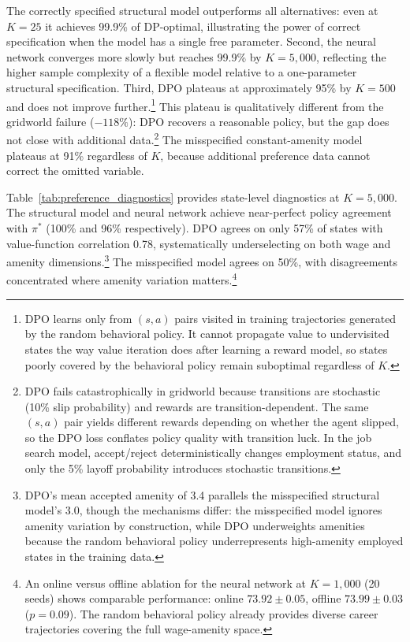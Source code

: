 The correctly specified structural model outperforms all alternatives: even at $K = 25$ it achieves 99.9\% of DP-optimal, illustrating the power of correct specification when the model has a single free parameter. Second, the neural network converges more slowly but reaches 99.9\% by $K = 5{,}000$, reflecting the higher sample complexity of a flexible model relative to a one-parameter structural specification. Third, DPO plateaus at approximately 95\% by $K = 500$ and does not improve further.\footnote{DPO learns only from $(s,a)$ pairs visited in training trajectories generated by the random behavioral policy. It cannot propagate value to undervisited states the way value iteration does after learning a reward model, so states poorly covered by the behavioral policy remain suboptimal regardless of $K$.} This plateau is qualitatively different from the gridworld failure ($-118\%$): DPO recovers a reasonable policy, but the gap does not close with additional data.\footnote{DPO fails catastrophically in gridworld because transitions are stochastic (10\% slip probability) and rewards are transition-dependent. The same $(s,a)$ pair yields different rewards depending on whether the agent slipped, so the DPO loss conflates policy quality with transition luck. In the job search model, accept/reject deterministically changes employment status, and only the 5\% layoff probability introduces stochastic transitions.} The misspecified constant-amenity model plateaus at 91\% regardless of $K$, because additional preference data cannot correct the omitted variable.

\begin{table}[htbp]
\centering
\caption[Diagnostics at $K = 5{,}000$ (single seed): policy agreement with $\pi^*$, value-function correlation, and mean accepted wage and amenity for each method]{\textbf{Diagnostics at $K = 5{,}000$ (single seed): policy agreement with $\pi^*$, value-function correlation, and mean accepted wage and amenity for each method.}}
\label{tab:preference_diagnostics}

\end{table}

Table~\ref{tab:preference_diagnostics} provides state-level diagnostics at $K = 5{,}000$. The structural model and neural network achieve near-perfect policy agreement with $\pi^*$ (100\% and 96\% respectively). DPO agrees on only 57\% of states with value-function correlation 0.78, systematically underselecting on both wage and amenity dimensions.\footnote{DPO's mean accepted amenity of 3.4 parallels the misspecified structural model's 3.0, though the mechanisms differ: the misspecified model ignores amenity variation by construction, while DPO underweights amenities because the random behavioral policy underrepresents high-amenity employed states in the training data.} The misspecified model agrees on 50\%, with disagreements concentrated where amenity variation matters.\footnote{An online versus offline ablation for the neural network at $K = 1{,}000$ (20 seeds) shows comparable performance: online $73.92 \pm 0.05$, offline $73.99 \pm 0.03$ ($p = 0.09$). The random behavioral policy already provides diverse career trajectories covering the full wage-amenity space.}

